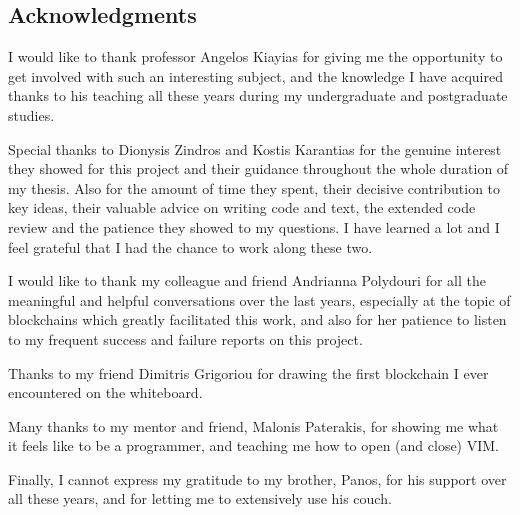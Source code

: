 \newpage
\begin{center}
    \section*{Acknowledgments}
\end{center}

I would like to thank professor Angelos Kiayias for giving me the opportunity
to get involved with such an interesting subject, and the knowledge I have
acquired thanks to his teaching all these years during my undergraduate and
postgraduate studies.

Special thanks to Dionysis Zindros and Kostis Karantias for the genuine
interest they showed for this project and their guidance throughout the whole
duration of my thesis. Also for the amount of time they spent, their decisive
contribution to key ideas, their valuable advice on writing code and text, the
extended code review and the patience they showed to my questions. I have
learned a lot and I feel grateful that I had the chance to work along these
two.

I would like to thank my colleague and friend Andrianna Polydouri for all the
meaningful and helpful conversations over the last years, especially at the
topic of blockchains which greatly facilitated this work, and also for her
patience to listen to my frequent success and failure reports on this project.

Thanks to my friend Dimitris Grigoriou for drawing the first blockchain I ever
encountered on the whiteboard.

Many thanks to my mentor and friend, Malonis Paterakis, for showing me
what it feels like to be a programmer, and teaching me how to open (and close)
VIM.

Finally, I cannot express my gratitude to my brother, Panos, for his support
over all these years, and for letting me to extensively use his couch.
